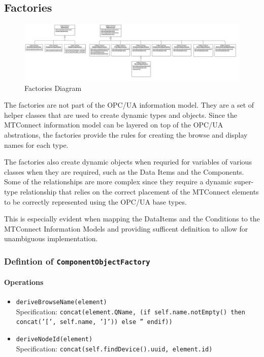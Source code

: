 \FloatBarrier

\subsection{Factories}

\begin{figure}
  \centering
    \includegraphics[width=1.0\textwidth]{diagrams/Factories.png}
  \caption{Factories Diagram}
  \label{fig:Factories}
\end{figure}

\FloatBarrier


The factories are not part of the OPC/UA information model. They are a set of helper 
classes that are used to create dynamic types and objects. Since the MTConnect 
information model can be layered on top of the OPC/UA abstrations, the factories
provide the rules for creating the browse and display names for each type.

The factories also create dynamic objects when requried for variables of various
classes when they are required, such as the Data Items and the Components. Some of the
relationships are more complex since they require a dynamic super-type relationship that
relies on the correct placement of the MTConnect elements to be correctly 
represented using the OPC/UA base types.

This is especially evident when mapping the DataItems and the Conditions to the 
MTConnect Information Models and providing sufficent definition to allow for 
unambiguous implementation.

\subsubsection{Defintion of \texttt{ComponentObjectFactory}} \label{type:ComponentObjectFactory}

\FloatBarrier



\paragraph{Operations}
\begin{itemize}
  \item \texttt{deriveBrowseName(element)}\\
    Specification: \texttt{concat(element.QName, (if self.name.notEmpty() then concat('[', self.name, ']')) else  '' endif))}

  \item \texttt{deriveNodeId(element)}\\
    Specification: \texttt{concat(self.findDevice().uuid, element.id)}

\end{itemize}
